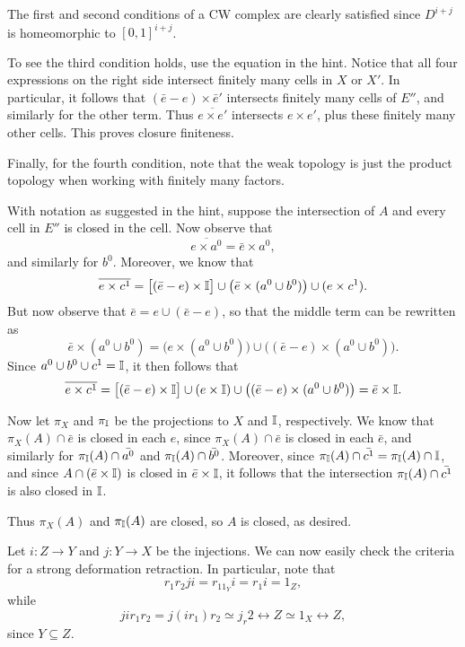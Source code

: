 \documentclass[../../solutions.tex]{subfiles}
\begin{document}
\begin{exercise} \leavevmode
The first and second conditions of a CW complex are clearly satisfied since $D^{i+j}$ is homeomorphic to $[0,1]^{i+j}$.

To see the third condition holds, use the equation in the hint.
Notice that all four expressions on the right side intersect finitely many cells in $X$ or $X'$.
In particular, it follows that $(\bar e-e)\times\bar e'$ intersects finitely many cells of $E''$, and similarly for the other term.
Thus $\overline{e\times e'}$ intersects $e\times e'$, plus these finitely many other cells.
This proves closure finiteness.

Finally, for the fourth condition, note that the weak topology is just the product topology when working with finitely many factors.
\end{exercise}

\begin{exercise} \leavevmode
With notation as suggested in the hint, suppose the intersection of $A$ and every cell in $E''$ is closed in the cell.
Now observe that
\[\overline{e\times a^0}=\bar e\times a^0,\]
and similarly for $b^0$.
Moreover, we know that
\[\overline{e\times c^1}=\big[(\bar e-e)\times\mathbb I\big]\cup\big(\bar e\times(a^0\cup b^0)\big)\cup(e\times c^1).\]
But now observe that $\bar e=e\cup(\bar e-e)$, so that the middle term can be rewritten as
\[\bar e\times(a^0\cup b^0)=\big(e\times(a^0\cup b^0)\big)\cup\big((\bar e-e)\times(a^0\cup b^0)\big).\]
Since $a^0\cup b^0\cup c^1=\mathbb I$, it then follows that
\[\overline{e\times c^1}=\big[(\bar e-e)\times\mathbb I\big]\cup(e\times\mathbb I)\cup\big((\bar e-e)\times(a^0\cup b^0)\big)=\bar e\times\mathbb I.\]

Now let $\pi_X$ and $\pi_\mathbb I$ be the projections to $X$ and $\mathbb I$, respectively.
We know that $\pi_X(A)\cap\bar e$ is closed in each $e$, since $\pi_X(A)\cap\bar e$ is closed in each $\bar e$, and similarly for $\pi_\mathbb I(A)\cap\bar{a^0}$ and $\pi_\mathbb I(A)\cap\bar{b^0}$.
Moreover, since $\pi_\mathbb I(A)\cap\bar{c^1}=\pi_\mathbb I(A)\cap\mathbb I$, and since $A\cap(\bar e\times\mathbb I)$ is closed in $\bar e\times\mathbb I$, it follows that the intersection $\pi_\mathbb I(A)\cap\bar{c^1}$ is also closed in $\mathbb I$.

Thus $\pi_X(A)$ and $\pi_\mathbb I(A)$ are closed, so $A$ is closed, as desired.
\end{exercise}

\begin{exercise} \leavevmode
Let $i:Z\to Y$ and $j:Y\to X$ be the injections.
We can now easily check the criteria for a strong deformation retraction.
In particular, note that
\[r_1r_2ji=r_11_Yi=r_1i=1_Z,\]
while
\[jir_1r_2=j(ir_1)r_2\simeq j_r2\rel{Z}\simeq1_X\rel{Z},\]
since $Y\subseteq Z$.
\end{exercise}
\end{document}
